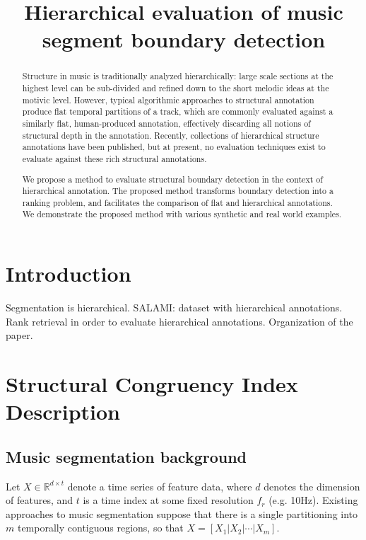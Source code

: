 \documentclass{article}
\title{Hierarchical evaluation of music segment boundary detection}
\begin{document}
%
\maketitle
%
\begin{abstract}
Structure in music is traditionally analyzed hierarchically: large scale sections at the highest level can be sub-divided and refined down to the short melodic ideas at the motivic level. 
However, typical algorithmic approaches to structural annotation produce flat temporal partitions of a track, which are commonly evaluated against a similarly flat, human-produced
annotation, effectively discarding all notions of structural depth in the annotation.
Recently, collections of hierarchical structure annotations have been published, but at present, no evaluation techniques exist to evaluate against these rich structural annotations.

We propose a method to evaluate structural boundary detection in the context of hierarchical annotation.
The proposed method transforms boundary detection into a ranking problem, and facilitates the comparison of flat and hierarchical annotations.
We demonstrate the proposed method with various synthetic and real world examples. 
\end{abstract}
%
\section{Introduction}\label{sec:introduction}

Segmentation is hierarchical.
SALAMI: dataset with hierarchical annotations.
Rank retrieval in order to evaluate hierarchical annotations.
Organization of the paper.

\section{Structural Congruency Index Description}\label{sec:eval_desc}

\subsection{Music segmentation background}

Let $X \in \mathbb{R}^{d\times t}$ denote a time series of feature data, where $d$ denotes the dimension of features, and $t$ is a time index at some fixed resolution $f_r$ (e.g. 10Hz).
Existing approaches to music segmentation suppose that there is a single partitioning into $m$ temporally contiguous regions, so that $X=[X_1|X_2|\cdots|X_m]$.
\end{document}
